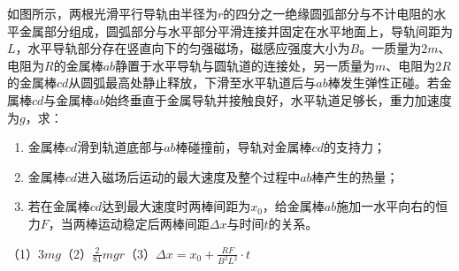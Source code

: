 如图所示，两根光滑平行导轨由半径为\(r\)的四分之一绝缘圆弧部分与不计电阻的水平金属部分组成，圆弧部分与水平部分平滑连接并固定在水平地面上，导轨间距为\(L\)，水平导轨部分存在竖直向下的匀强磁场，磁感应强度大小为\(B\)。一质量为\(2m\)、电阻为\(R\)的金属棒\(ab\)静置于水平导轨与圆轨道的连接处，另一质量为\(m\)、电阻为\(2R\)的金属棒\(cd\)从圆弧最高处静止释放，下滑至水平轨道后与\(ab\)棒发生弹性正碰。若金属棒\(cd\)与金属棒\(ab\)始终垂直于金属导轨并接触良好，水平轨道足够长，重力加速度为\(g\)，求：
\begin{enumerate}
	\item 金属棒\(cd\)滑到轨道底部与\(ab\)棒碰撞前，导轨对金属棒\(cd\)的支持力；
	\item 金属棒\(cd\)进入磁场后运动的最大速度及整个过程中\(ab\)棒产生的热量；
	\item 若在金属棒\(cd\)达到最大速度时两棒间距为\(x_0\)，给金属棒\(ab\)施加一水平向右的恒力\(F\)，当两棒运动稳定后两棒间距\(\Delta x\)与时间\(t\)的关系。
\end{enumerate}
\begin{answer}
	（1）\(3mg\)（2）\(\frac{2}{81}mgr\)（3）\(\Delta x = x_0 + \frac{RF}{B^2L^2}\cdot t\)
\end{answer}